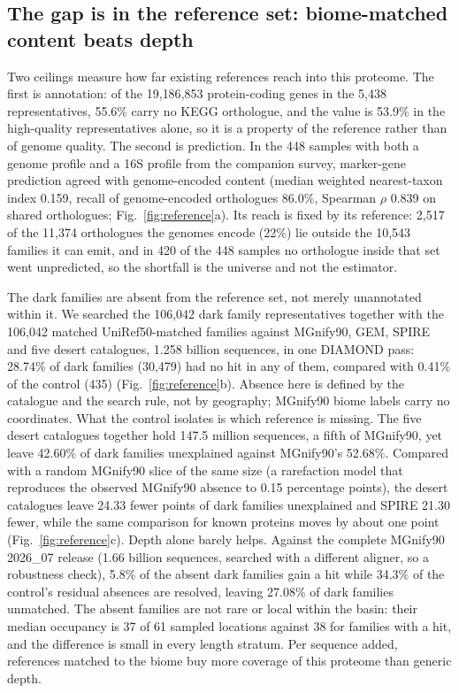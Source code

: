 \documentclass[11pt]{article}
\begin{document}
\subsection*{The gap is in the reference set: biome-matched content beats depth}

Two ceilings measure how far existing references reach into this proteome. The first is
annotation: of the 19{,}186{,}853 protein-coding genes in the 5{,}438 representatives, 55.6\% carry
no KEGG orthologue, and the value is 53.9\% in the high-quality representatives alone, so it is a
property of the reference rather than of genome quality. The second is prediction. In the 448
samples with both a genome profile and a 16S profile from the companion survey, marker-gene
prediction agreed with genome-encoded content (median weighted nearest-taxon index 0.159, recall of
genome-encoded orthologues 86.0\%, Spearman $\rho$ 0.839 on shared orthologues;
Fig.~\ref{fig:reference}a). Its reach is fixed by its reference: 2{,}517 of the 11{,}374
orthologues the genomes encode (22\%) lie outside the 10{,}543 families it can emit, and in 420 of
the 448 samples no orthologue inside that set went unpredicted, so the shortfall is the universe and
not the estimator.

The dark families are absent from the reference set, not merely unannotated within it. We searched
the 106{,}042 dark family representatives together with the 106{,}042 matched UniRef50-matched
families against MGnify90, GEM, SPIRE and five desert catalogues, 1.258 billion sequences, in one
DIAMOND pass: 28.74\% of dark families (30{,}479) had no hit in any of them, compared with 0.41\% of
the control (435) (Fig.~\ref{fig:reference}b). Absence here is defined by the catalogue and the
search rule, not by geography; MGnify90 biome labels carry no coordinates. What the control isolates
is which reference is missing. The five desert catalogues together hold 147.5 million sequences, a
fifth of MGnify90, yet leave 42.60\% of dark families unexplained against MGnify90's 52.68\%.
Compared with a random MGnify90 slice of the same size (a rarefaction model that reproduces the
observed MGnify90 absence to 0.15 percentage points), the desert catalogues leave 24.33 fewer points
of dark families unexplained and SPIRE 21.30 fewer, while the same comparison for known proteins moves
by about one point (Fig.~\ref{fig:reference}c). Depth alone barely helps. Against the complete
MGnify90 2026\_07 release (1.66 billion sequences, searched with a different aligner, so a robustness
check), 5.8\% of
the absent dark families gain a hit while 34.3\% of the control's residual absences are resolved,
leaving 27.08\% of dark families unmatched. The absent families are not rare or local within the
basin: their median occupancy is 37 of 61 sampled locations against 38 for families with a hit, and
the difference is small in every length stratum. Per sequence added, references matched to the biome
buy more coverage of this proteome than generic depth.
\end{document}
